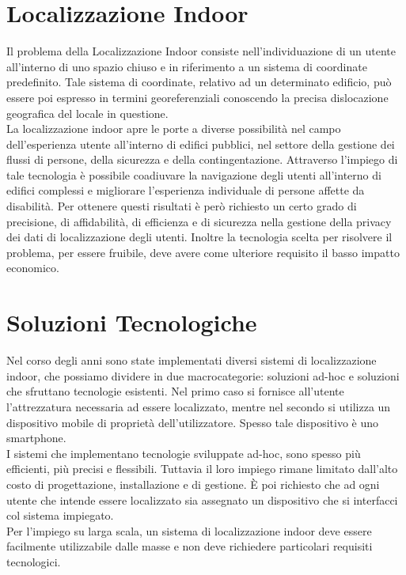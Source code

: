 \documentclass[draft]{standalone}
\begin{document}
\section{Localizzazione Indoor}
Il problema della Localizzazione Indoor consiste nell'individuazione di un
utente all'interno di uno spazio chiuso e in riferimento a un sistema di
coordinate predefinito. Tale sistema di coordinate, relativo ad un determinato
edificio, può essere poi espresso in termini georeferenziali conoscendo la
precisa dislocazione geografica del locale in questione. \\
La localizzazione indoor apre le porte a diverse possibilità nel campo
dell'esperienza utente all'interno di edifici pubblici, nel settore
della gestione dei flussi di persone, della sicurezza e della contingentazione.
Attraverso l'impiego di tale tecnologia è possibile coadiuvare la navigazione
degli utenti all'interno di edifici complessi e migliorare l'esperienza
individuale di persone affette da disabilità. Per ottenere questi risultati è
però richiesto un certo grado di precisione, di affidabilità, di efficienza e
di sicurezza nella gestione della privacy dei dati di localizzazione degli
utenti. Inoltre la tecnologia scelta per risolvere il problema, per essere
fruibile, deve avere come ulteriore requisito il basso impatto economico.

\section{Soluzioni Tecnologiche}
Nel corso degli anni sono state implementati diversi sistemi di
localizzazione indoor, che possiamo dividere in due macrocategorie: soluzioni
ad-hoc e soluzioni che sfruttano tecnologie esistenti. Nel primo caso si
fornisce all'utente l'attrezzatura necessaria ad essere localizzato, mentre nel
secondo si utilizza un dispositivo mobile di proprietà dell'utilizzatore.
Spesso tale dispositivo è uno smartphone. \\ I sistemi che implementano
tecnologie sviluppate ad-hoc, sono spesso più efficienti, più precisi e
flessibili. Tuttavia il loro impiego rimane limitato dall'alto costo di
progettazione, installazione e di gestione. È poi richiesto che ad ogni utente
che intende essere localizzato sia assegnato un dispositivo che si interfacci
col sistema impiegato. \\
Per l'impiego su larga scala, un sistema di localizzazione indoor deve essere
facilmente utilizzabile dalle masse e non deve richiedere particolari requisiti
tecnologici.  \\
\end{document}
